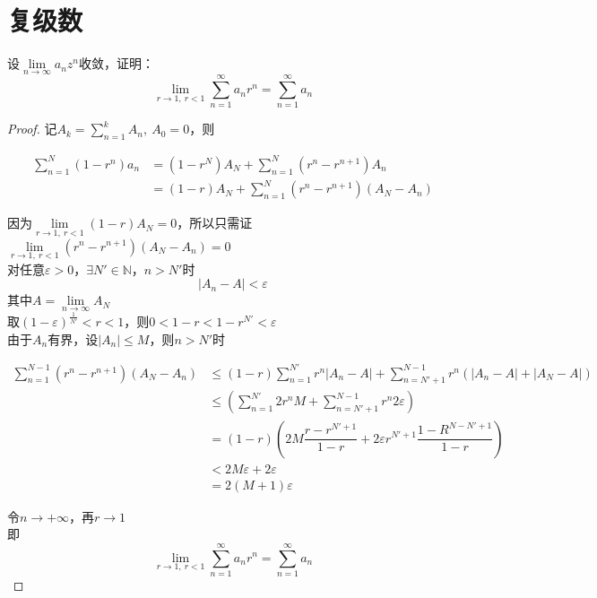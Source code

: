 \section{复级数}

\begin{proposition}

    设$\lim\limits_{n \to \infty}{a_nz^n}$收敛，证明：
    $$\lim\limits_{r \to 1,\ r < 1}{\sum\limits_{n = 1}^{\infty}{a_nr^n}} = \sum\limits_{n = 1}^{\infty}{a_n}$$

\end{proposition}

\begin{proof}
    
    记$A_k = \sum\limits_{n = 1}^{k}{A_n},\ A_0 = 0$，则

    \begin{align*}
        \sum\limits_{n = 1}^{N}{(1 - r^n)a_n} & = (1 - r^N)A_N + \sum\limits_{n = 1}^{N}{(r^n - r^{n + 1})A_n}\\
        & = (1 - r)A_N + \sum\limits_{n = 1}^{N}{(r^n - r^{n + 1})(A_N - A_n)}
    \end{align*}

    因为$\lim\limits_{r \to 1,\ r < 1}{(1 - r)A_N} = 0$，所以只需证$\lim\limits_{r \to 1,\ r < 1}{(r^n - r^{n + 1})(A_N - A_n)} = 0$\\
    对任意$\varepsilon > 0 $，$\exists N' \in \mathbb{N}$，$n > N'$时
    $$|A_n - A| < \varepsilon $$
    其中$A = \lim\limits_{n \to \infty}{A_N}$\\
    取$(1 - \varepsilon)^{\frac{1}{N'}} < r < 1$，则$0 < 1 - r < 1 - r^{N'} < \varepsilon $\\
    由于$A_n$有界，设$|A_n| \leq M $，则$n > N'$时
    
    \begin{align*}
        \sum\limits_{n = 1}^{N-1}{(r^n - r^{n + 1})(A_N - A_n)} & \leq (1 - r)\sum\limits_{n = 1}^{N'}{r^n|A_n - A|} + \sum\limits_{n=N'+1}^{N-1}{r^n(|A_n - A| + |A_N -A|)}\\
        & \leq (\sum\limits_{n = 1}^{N'}{2r^nM} + \sum\limits_{n=N'+1}^{N-1}{r^n2\varepsilon})\\
        & = (1 - r)\left(2M\dfrac{r - r^{N'+1}}{1 - r} + 2\varepsilon r^{N'+1}\dfrac{1 - R^{N-N'+1}}{1 - r}\right)\\
        & < 2M\varepsilon + 2\varepsilon\\
        & = 2(M+1)\varepsilon
    \end{align*}

    令$n \to +\infty$，再$r \to 1$\\
    即
    $$\lim\limits_{r \to 1,\ r < 1}{\sum\limits_{n = 1}^{\infty}{a_nr^n}} = \sum\limits_{n = 1}^{\infty}{a_n}$$

\end{proof}

